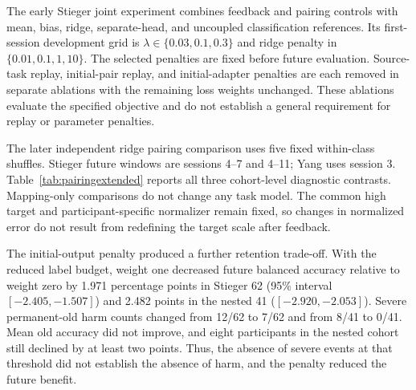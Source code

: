 \documentclass[11pt,a4paper]{article}
\begin{document}
The early Stieger joint experiment combines feedback and pairing controls with mean, bias, ridge, separate-head, and uncoupled classification references. Its first-session development grid is $\lambda\in\{0.03,0.1,0.3\}$ and ridge penalty in $\{0.01,0.1,1,10\}$. The selected penalties are fixed before future evaluation. Source-task replay, initial-pair replay, and initial-adapter penalties are each removed in separate ablations with the remaining loss weights unchanged. These ablations evaluate the specified objective and do not establish a general requirement for replay or parameter penalties.

The later independent ridge pairing comparison uses five fixed within-class shuffles. Stieger future windows are sessions 4--7 and 4--11; Yang uses session 3. Table~\ref{tab:pairingextended} reports all three cohort-level diagnostic contrasts. Mapping-only comparisons do not change any task model. The common high target and participant-specific normalizer remain fixed, so changes in normalized error do not result from redefining the target scale after feedback.

The initial-output penalty produced a further retention trade-off. With the reduced label budget, weight one decreased future balanced accuracy relative to weight zero by 1.971 percentage points in Stieger 62 (95\% interval $[-2.405,-1.507]$) and 2.482 points in the nested 41 ($[-2.920,-2.053]$). Severe permanent-old harm counts changed from 12/62 to 7/62 and from 8/41 to 0/41. Mean old accuracy did not improve, and eight participants in the nested cohort still declined by at least two points. Thus, the absence of severe events at that threshold did not establish the absence of harm, and the penalty reduced the future benefit.
\end{document}
